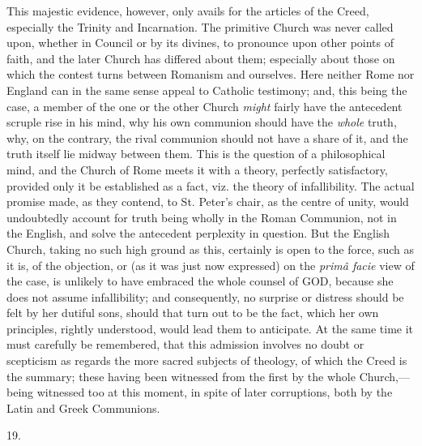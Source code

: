 This majestic evidence, however, only avails for
the articles of the Creed, especially the Trinity and Incarnation. The
primitive Church was never called upon, whether in Council or by its
divines, to pronounce upon other points of faith, and the later Church
has differed about them; especially about those on which the contest
turns between Romanism and ourselves. Here neither Rome nor England
can in the same sense appeal to Catholic testimony; and, this being
the case, a member of the one or the other Church \emph{might} fairly have
the antecedent scruple rise in his mind, why his own communion should
have the \emph{whole} truth, why, on the contrary, the rival communion
should not have a share of it, and the truth itself lie midway between
them. This is the question of a philosophical mind, and the Church of
Rome meets it with a theory, perfectly satisfactory, provided only it
be established as a fact, viz. the theory of infallibility. The actual
promise made, as they contend, to St. Peter's chair, as the centre of
unity, would undoubtedly account for truth being wholly in the Roman
Communion, not in the English, and solve the antecedent perplexity in
question. But the English Church, taking no such high ground as this,
certainly is open to the force, such as it is, of the objection, or
(as it was just now expressed) on the \emph{primâ facie} view of the
case, is unlikely to have embraced the whole counsel of GOD,
because she does not assume infallibility; and consequently, no
surprise or distress should be felt by her dutiful sons, should that
turn out to be the fact, which her own principles, rightly understood,
would lead them to anticipate. At the same time it must carefully be
remembered, that this admission involves no doubt or scepticism as
regards the more sacred subjects of theology, of which the Creed is the summary; these having been witnessed from the first by the
whole Church,—being witnessed too at this moment, in spite of later
corruptions, both by the Latin and Greek Communions.

19.


